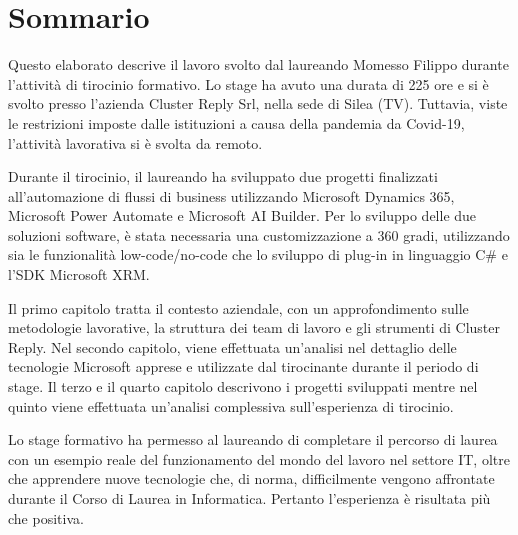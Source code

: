 \chapter*{Sommario} %
\label{sommario}

Questo elaborato descrive il lavoro svolto dal laureando Momesso Filippo durante l'attività di tirocinio formativo. Lo stage ha avuto una durata di 225 ore e si è svolto presso l'azienda Cluster Reply Srl, nella sede di Silea (TV). Tuttavia, viste le restrizioni imposte dalle istituzioni a causa della pandemia da Covid-19, l'attività lavorativa si è svolta da remoto.

Durante il tirocinio, il laureando ha sviluppato due progetti finalizzati all'automazione di flussi di business utilizzando Microsoft Dynamics 365, Microsoft Power Automate e Microsoft AI Builder. Per lo sviluppo delle due soluzioni software, è stata necessaria una customizzazione a \num{360} gradi, utilizzando sia le funzionalità low-code/no-code che lo sviluppo di plug-in in linguaggio C\# e l'SDK Microsoft XRM. 

Il primo capitolo tratta il contesto aziendale, con un approfondimento sulle metodologie lavorative, la struttura dei team di lavoro e gli strumenti di Cluster Reply. Nel secondo capitolo, viene effettuata un'analisi nel dettaglio delle tecnologie Microsoft apprese e utilizzate dal tirocinante durante il periodo di stage. 
Il terzo e il quarto capitolo descrivono i progetti sviluppati mentre nel quinto viene effettuata un'analisi complessiva sull'esperienza di tirocinio. 

Lo stage formativo ha permesso al laureando di completare il percorso di laurea con un esempio reale del funzionamento del mondo del lavoro nel settore IT, oltre che apprendere nuove tecnologie che, di norma, difficilmente vengono affrontate durante il Corso di Laurea in Informatica. Pertanto l'esperienza è risultata più che positiva. 
\newpage

